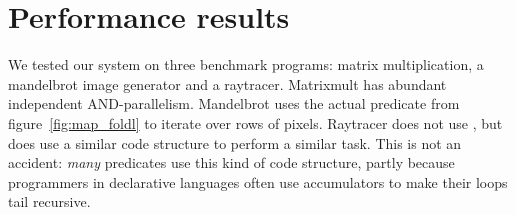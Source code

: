 \section{Performance results}
\label{sec:perf}



We tested our system on three benchmark programs:
matrix multiplication, a mandelbrot image generator and a raytracer.
Matrixmult has abundant independent AND-parallelism.
Mandelbrot uses the actual  predicate
from figure~\ref{fig:map_foldl}
to iterate over rows of pixels.
Raytracer does not use ,
but does use a similar code structure to perform a similar task.
This is not an accident:
\emph{many} predicates use this kind of code structure,
partly because programmers in declarative languages
often use accumulators to make their loops tail recursive.


